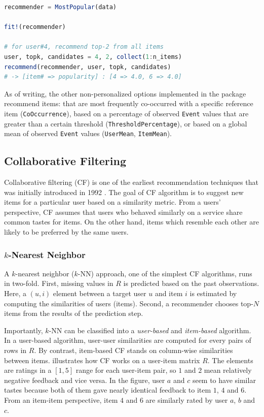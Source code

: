 \begin{lstlisting}[language = Julia]
recommender = MostPopular(data)

fit!(recommender)

# for user#4, recommend top-2 from all items
user, topk, candidates = 4, 2, collect(1:n_items)
recommend(recommender, user, topk, candidates)
# -> [item# => popularity] : [4 => 4.0, 6 => 4.0]
\end{lstlisting}

As of writing, the other non-personalized options implemented in the package recommend items: that are most frequently co-occurred with a specific reference item (\texttt{CoOccurrence}), based on a percentage of observed \texttt{Event} values that are greater than a certain threshold (\texttt{ThresholdPercentage}), or based on a global mean of observed \texttt{Event} values (\texttt{UserMean}, \texttt{ItemMean}).

\subsection{Collaborative Filtering}
\label{sec:cf}

Collaborative filtering (CF) is one of the earliest recommendation techniques that was initially introduced in 1992 \cite{Goldberg1992}. The goal of CF algorithm is to suggest new items for a particular user based on a similarity metric. From a users' perspective, CF assumes that users who behaved similarly on a service share common tastes for items. On the other hand, items which resemble each other are likely to be preferred by the same users.

\subsubsection{$k$-Nearest Neighbor}

A $k$-nearest neighbor ($k$-NN) approach, one of the simplest CF algorithms, runs in two-fold. First, missing values in $R$ is predicted based on the past observations. Here, a $(u, i)$ element between a target user $u$ and item $i$ is estimated by computing the similarities of users (items). Second, a recommender chooses top-$N$ items from the results of the prediction step.

Importantly, $k$-NN can be classified into a \textit{user-based} and \textit{item-based} algorithm. In a user-based algorithm, user-user similarities are computed for every pairs of rows in $R$. By contrast, item-based CF stands on column-wise similarities between items.  illustrates how CF works on a user-item matrix $R$. The elements are ratings in a $[1, 5]$ range for each user-item pair, so $1$ and $2$ mean relatively negative feedback and vice versa. In the figure, user $a$ and $c$ seem to have similar tastes because both of them gave nearly identical feedback to item $1$, $4$ and $6$. From an item-item perspective, item $4$ and $6$ are similarly rated by user $a$, $b$ and $c$.

